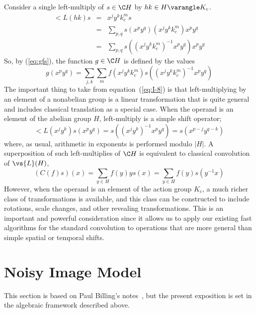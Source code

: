 Consider a single left-multiply of $s\in \C H$ by $hk\in
H\varangle K_c$.
\begin{eqnarray*}
\lt{L}(hk) s &=& x^jy^kk_c^m s \\
&=& \sum_{p,q} s(x^py^q)(x^jy^kk_c^m) x^py^q\\
&=& \sum_{p,q} s((x^jy^kk_c^m)^{-1}x^py^q) x^py^q
\end{eqnarray*}
So, by (\ref{eq:gfs}), the function $g\in \C H$ is defined
by the values 
\begin{equation}\label{eq:I-8}
g(x^py^q) = \sum_{j,k}\sum_{m} f(x^jy^kk_c^m)
s((x^jy^kk_c^m)^{-1}x^py^q) 
\end{equation}
The important thing to take from equation~(\ref{eq:I-8})
is that left-multiplying by an element of a nonabelian group
is a linear transformation that is quite general and includes
classical translation as a special case.
When the operand is an element of the abelian group $H$,
left-multiply is a simple shift operator; \eg
\begin{equation}\label{eq:shift}
\lt{L}(x^jy^k)s(x^py^q) = s((x^jy^k)^{-1}x^py^q) =s(x^{p-j}y^{q-k})
\end{equation}
where, as usual, arithmetic in exponents is performed modulo $|H|$.
A superposition of such left-multiplies of $\C H$ is
equivalent to classical convolution of $\vs{L}(H)$,
\[
(C(f)s)(x) = \sum_{y\in H} f(y)ys(x) = \sum_{y\in H} f(y)s(y^{-1}x)
\]
However, when the operand is an element of the action group $K_c$,
a much richer class of transformations is available, and
this class can be constructed to include rotations, scale
changes, and other revealing transformations.  This is an
important and powerful consideration since it allows us to
apply our existing fast algorithms for the standard
convolution to operations that are more general than simple
spatial or temporal shifts.    


   \newcommand\groupA{\ensuremath{A}}
   \newcommand\groupK{\ensuremath{K}}
   \newcommand\groupJ{\ensuremath{J}}
\section{Noisy Image Model}\label{sec:poiss-object}
This section is based on Paul Billing's notes~\cite{Billings:2001}, but the
present exposition is set in the algebraic framework
described above.


